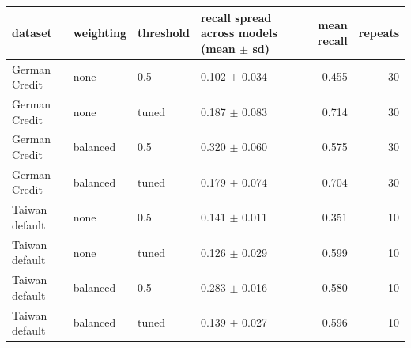 \begin{tabular}{llllrr}
\toprule
dataset & weighting & threshold & recall spread across models (mean $\pm$ sd) & mean recall & repeats \\
\midrule
German Credit & none & 0.5 & 0.102 $\pm$ 0.034 & 0.455 & 30 \\
German Credit & none & tuned & 0.187 $\pm$ 0.083 & 0.714 & 30 \\
German Credit & balanced & 0.5 & 0.320 $\pm$ 0.060 & 0.575 & 30 \\
German Credit & balanced & tuned & 0.179 $\pm$ 0.074 & 0.704 & 30 \\
Taiwan default & none & 0.5 & 0.141 $\pm$ 0.011 & 0.351 & 10 \\
Taiwan default & none & tuned & 0.126 $\pm$ 0.029 & 0.599 & 10 \\
Taiwan default & balanced & 0.5 & 0.283 $\pm$ 0.016 & 0.580 & 10 \\
Taiwan default & balanced & tuned & 0.139 $\pm$ 0.027 & 0.596 & 10 \\
\bottomrule
\end{tabular}
